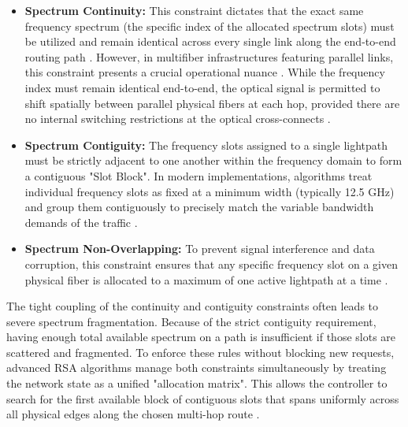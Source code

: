 \begin{itemize}
    \item \textbf{Spectrum Continuity:} This constraint dictates that the exact same frequency spectrum (the specific index of the allocated spectrum slots) must be utilized and remain identical across every single link along the end-to-end routing path \cite{algorithmResearchRSAONR}. However, in multifiber infrastructures featuring parallel links, this constraint presents a crucial operational nuance \cite{efficientDynamicRSAEon}. While the frequency index must remain identical end-to-end, the optical signal is permitted to shift spatially between parallel physical fibers at each hop, provided there are no internal switching restrictions at the optical cross-connects \cite{efficientDynamicRSAEon}.
    \item \textbf{Spectrum Contiguity:} The frequency slots assigned to a single lightpath must be strictly adjacent to one another within the frequency domain to form a contiguous "Slot Block". In modern implementations, algorithms treat individual frequency slots as fixed at a minimum width (typically 12.5 GHz) and group them contiguously to precisely match the variable bandwidth demands of the traffic \cite{algorithmsRSATaxonomy}.
    \item \textbf{Spectrum Non-Overlapping:} To prevent signal interference and data corruption, this constraint ensures that any specific frequency slot on a given physical fiber is allocated to a maximum of one active lightpath at a time \cite{efficientDynamicRSAEon}.
\end{itemize}
The tight coupling of the continuity and contiguity constraints often leads to severe spectrum fragmentation. Because of the strict contiguity requirement, having enough total available spectrum on a path is insufficient if those slots are scattered and fragmented. To enforce these rules without blocking new requests, advanced RSA algorithms manage both constraints simultaneously by treating the network state as a unified "allocation matrix". This allows the controller to search for the first available block of contiguous slots that spans uniformly across all physical edges along the chosen multi-hop route \cite{rsaFlexGrid}.
